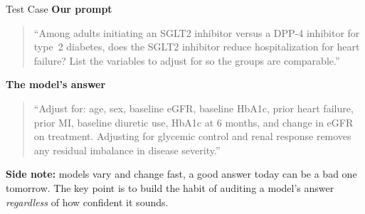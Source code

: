 \documentclass[aspectratio=169]{beamer}
\begin{document}
\begin{frame}{Test Case}
  \small
  \textcolor{accent}{\textbf{Our prompt}}
  \begin{quote}\small
    ``Among adults initiating an SGLT2 inhibitor versus a DPP-4 inhibitor for
    type~2 diabetes, does the SGLT2 inhibitor reduce hospitalization for heart
    failure? List the variables to adjust for so the groups are comparable.''
  \end{quote}

  \textcolor{accent}{\textbf{The model's answer}}
  \begin{quote}\small
    ``Adjust for: age, sex, baseline eGFR, baseline HbA1c, prior heart failure,
    prior MI, baseline diuretic use, HbA1c at 6 months, and change in eGFR on treatment. Adjusting for
    glycemic control and renal response removes any residual imbalance in disease
    severity.''
  \end{quote}

  {\footnotesize\textcolor{accent}{\textbf{Side note:}} models vary and change fast, a
  good answer today can be a bad one tomorrow. The key point is to build the habit of
  auditing a model's answer \emph{regardless} of how confident it sounds.}
\end{frame}
\end{document}
